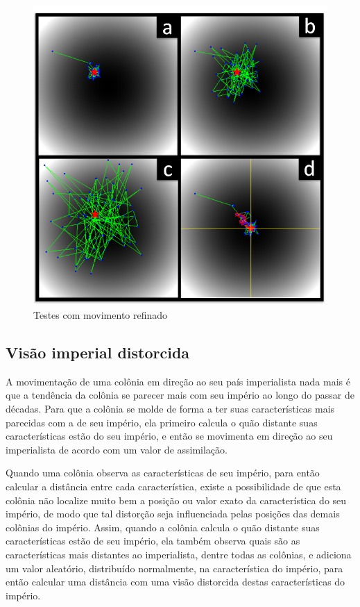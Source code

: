 \begin{figure}[htp]
	\centering
	\includegraphics[scale=0.9]{Figuras/Movimento_Refinado.png}
	\caption{Testes com movimento refinado}
	\label{fig:Movimento_Refinado}
\end{figure}






\subsection{Visão imperial distorcida}

A movimentação de uma colônia em direção ao seu país imperialista nada mais é que a tendência da colônia  se parecer mais com seu império ao longo do passar de décadas. Para que a colônia se molde de forma a ter suas características mais parecidas com a de seu império, ela primeiro calcula o quão distante suas características estão do seu império, e então se movimenta em direção ao seu imperialista de acordo com um valor de assimilação. 

Quando uma colônia observa as características de seu império, para então calcular a distância entre cada característica, existe a possibilidade de que esta colônia não localize muito bem a posição ou valor exato da característica do seu império, de modo que tal distorção seja influenciada pelas posições das demais colônias do império. Assim, quando a colônia calcula o quão distante suas características estão de seu império, ela também observa quais são as características mais distantes ao imperialista, dentre todas as colônias, e adiciona um valor aleatório, distribuído normalmente, na característica do império, para então calcular uma distância com uma visão distorcida destas características do império.

